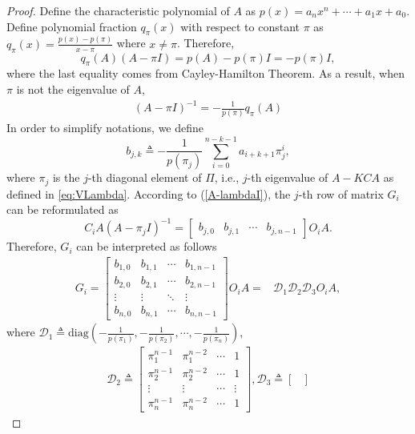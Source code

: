 \documentclass{ieeetrans}   %
\newtheorem*{proof}{\textbf{Proof}}
\begin{document}
\begin{proof}
	Define the characteristic polynomial of $A$ as $p(x)=a_n x^n +\cdots+a_1 x +a_0$.
	Define polynomial fraction  $q_\pi(x)$ with respect to constant $\pi$ as
	$q_\pi(x)=\frac{p(x)-p(\pi)}{x-\pi}$ where $x\neq \pi$.
	Therefore,
	$$q_\pi(A)(A-\pi I) = p(A)-p(\pi)I=-p(\pi)I ,$$
	where the last equality comes from Cayley-Hamilton Theorem.
	As a result, when $\pi$ is not the eigenvalue of $A$,
	\begin{align}\label{A-lambdaI}
		(A-\pi I)^{-1}=-\frac{1}{p(\pi)} q_\pi(A)
	\end{align}
	In order to simplify notations, we define 
	\begin{equation}\label{eq:bjk}
		b_{j,k}\triangleq-\frac{1}{p(\pi_j)}\sum_{i=0}^{n-k-1} a_{i+k+1} \pi_j^i,
	\end{equation}
	where $\pi_j$ is the $j$-th diagonal element of $\Pi$, i.e., $j$-th eigenvalue of $A-KCA$ as defined in \eqref{eq:VLambda}.
	According to (\ref{A-lambdaI}), the $j$-th row of matrix $G_i$ can be reformulated as
	$$C_{i} A\left(A-\pi_{j} I\right)^{-1}=
	\begin{bmatrix}
		b_{j,0} & b_{j,1} & \cdots  & b_{j,n-1} 
	\end{bmatrix} O_i A.$$
	Therefore, $G_i$ can be interpreted as follows
	\begin{align*}
		G_i = \begin{bmatrix}
			b_{1,0} & b_{1,1} & \cdots  & b_{1,n-1} \\
			b_{2,0} & b_{2,1} & \cdots  & b_{2,n-1} \\
			\vdots & \vdots & \ddots  & \vdots \\
			b_{n,0} & b_{n,1} & \cdots  & b_{n,n-1} 
		\end{bmatrix}
		O_i A 
		= & \mathcal{D}_1\mathcal{D}_2\mathcal{D}_3 O_i A , %
	\end{align*}
	where $\mathcal{D}_1\triangleq\text{diag}\left(-\frac{1}{p(\pi_1)},-\frac{1}{p(\pi_2)},\cdots,-\frac{1}{p(\pi_n)}\right)$,
	\begin{align*}
		\mathcal{D}_2\triangleq
		\begin{bmatrix}
			\pi_1^{n-1} & \pi_1^{n-2} & \cdots  & 1 \\
			\pi_2^{n-1} & \pi_2^{n-2} & \cdots  & 1 \\
			\vdots & \vdots & \cdots  & \vdots \\
			\pi_n^{n-1} & \pi_n^{n-2} & \cdots  & 1
		\end{bmatrix}, 
		\mathcal{D}_3\triangleq
		\begin{bmatrix}

\end{bmatrix}
\end{align*}
\end{proof}
\end{document}
